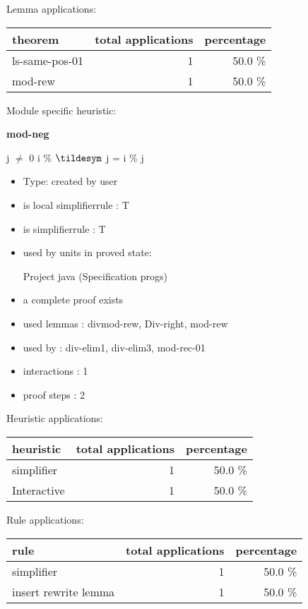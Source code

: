 \documentclass[a4paper]{article}
\begin{document}
Lemma applications:

\begin{supertabular}{l|r|r}
theorem	        & total applications & percentage \\ \hline
ls-same-pos-01 & 1 & 50.0 \% \\
mod-rew & 1 & 50.0 \% \\

\end{supertabular}

Module specific heuristic:

\pagebreak

{\LARGE\bf mod-neg}\label{lemma-mod-neg}

\medskip

j $\neq$ 0 \Fol i \% $\tildesym$ j = i \% j

\begin{itemize}

\item Type: created by user

\item is local simplifierrule : T
\item is simplifierrule : T
\item used by units in proved state:

Project java (Specification progs)
\item       a complete proof exists
\item       used lemmas  : divmod-rew, Div-right, mod-rew
\item       used by      : div-elim1, div-elim3, mod-rec-01
\item       interactions : 1
\item       proof steps  : 2
\end{itemize}

\medskip


Heuristic applications:

\begin{supertabular}{l|r|r}
heuristic	& total applications & percentage \\ \hline
simplifier & 1 & 50.0 \% \\
Interactive & 1 & 50.0 \% \\

\end{supertabular}

Rule applications:

\begin{supertabular}{l|r|r}
rule	        & total applications & percentage \\ \hline
simplifier & 1 & 50.0 \% \\
insert rewrite lemma & 1 & 50.0 \% \\

\end{supertabular}
\end{document}
